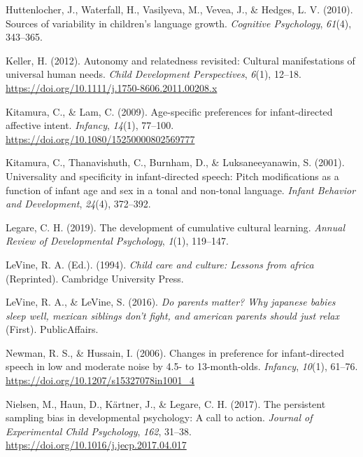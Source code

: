 \documentclass[
  ,man,floatsintext]{apa6}
\newlength{\cslhangindent}
\newlength{\cslentryspacingunit} %
\newenvironment{CSLReferences}[2] %
 {%
  \setlength{\parindent}{0pt}
  \ifodd #1
  \let\oldpar\par
  \def\par{\hangindent=\cslhangindent\oldpar}
  \fi
  \setlength{\parskip}{#2\cslentryspacingunit}
 }%
 {}
\begin{document}
\begin{CSLReferences}{1}{0}
\leavevmode{}%
Huttenlocher, J., Waterfall, H., Vasilyeva, M., Vevea, J., \& Hedges, L. V. (2010). Sources of variability in children's language growth. \emph{Cognitive Psychology}, \emph{61}(4), 343--365.

\leavevmode{}%
Keller, H. (2012). Autonomy and relatedness revisited: Cultural manifestations of universal human needs. \emph{Child Development Perspectives}, \emph{6}(1), 12--18. \url{https://doi.org/10.1111/j.1750-8606.2011.00208.x}

\leavevmode{}%
Kitamura, C., \& Lam, C. (2009). Age-specific preferences for infant-directed affective intent. \emph{Infancy}, \emph{14}(1), 77--100. \url{https://doi.org/10.1080/15250000802569777}

\leavevmode{}%
Kitamura, C., Thanavishuth, C., Burnham, D., \& Luksaneeyanawin, S. (2001). Universality and specificity in infant-directed speech: Pitch modifications as a function of infant age and sex in a tonal and non-tonal language. \emph{Infant Behavior and Development}, \emph{24}(4), 372--392.

\leavevmode{}%
Legare, C. H. (2019). The development of cumulative cultural learning. \emph{Annual Review of Developmental Psychology}, \emph{1}(1), 119--147.

\leavevmode{}%
LeVine, R. A. (Ed.). (1994). \emph{Child care and culture: Lessons from africa} (Reprinted). Cambridge University Press.

\leavevmode{}%
LeVine, R. A., \& LeVine, S. (2016). \emph{Do parents matter? Why japanese babies sleep well, mexican siblings don't fight, and american parents should just relax} (First). PublicAffairs.

\leavevmode{}%
Newman, R. S., \& Hussain, I. (2006). Changes in preference for infant-directed speech in low and moderate noise by 4.5- to 13-month-olds. \emph{Infancy}, \emph{10}(1), 61--76. \url{https://doi.org/10.1207/s15327078in1001_4}

\leavevmode{}%
Nielsen, M., Haun, D., Kärtner, J., \& Legare, C. H. (2017). The persistent sampling bias in developmental psychology: A call to action. \emph{Journal of Experimental Child Psychology}, \emph{162}, 31--38. \url{https://doi.org/10.1016/j.jecp.2017.04.017}


\end{CSLReferences}
\end{document}
